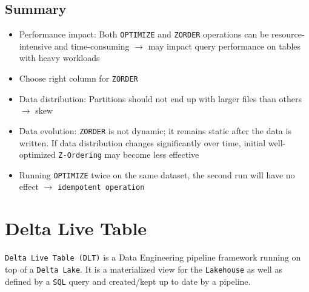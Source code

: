 \documentclass[11pt]{scrartcl}
\begin{document}
\subsection{Summary}
\begin{itemize}
	\item Performance impact: Both \texttt{OPTIMIZE} and \texttt{ZORDER} operations can be resource-intensive and time-consuming $\to$ may impact query performance on tables with heavy workloads
	\item Choose right column for \texttt{ZORDER}
	\item Data distribution: Partitions should not end up with larger files than others $\to$ skew
	\item Data evolution: \texttt{ZORDER} is not dynamic; it remains static after the data is written. If data distribution changes significantly over time, initial well-optimized \texttt{Z-Ordering} may become less effective
	\item Running \texttt{OPTIMIZE} twice on the same dataset, the second run will have no effect $\to$ \texttt{idempotent operation}
\end{itemize}


\newpage
\section{Delta Live Table} \label{delta_live_table}
\texttt{Delta Live Table (DLT)} is a Data Engineering pipeline framework running on top of a \texttt{Delta Lake}. It is a materialized view for the \texttt{Lakehouse} as well as defined by a \texttt{SQL} query and created/kept up to date by a pipeline.
\end{document}
